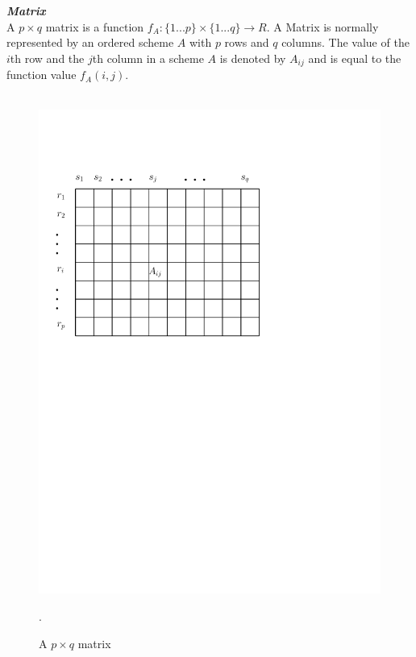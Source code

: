 \documentclass[12pt,a4paper,twoside]{scrartcl}
\numberwithin{equation}{section}
\begin{document}
\emph{\textbf{Matrix}}\\
A $p\times q$ matrix is a function $f_A: \{1...p\}\times\{1...q\}\rightarrow R$. A Matrix is normally represented by an ordered scheme $A$ with $p$ rows and $q$ columns. The value of the $i$th row and the $j$th column in a scheme $A$ is denoted by $A_{ij}$ and is equal to the function value $f_A(i, j)$.
\begin{figure}[h!]
\centering
 \hbox{\hspace{12em} \includegraphics[scale = 0.6]{1/matrix.pdf}}
 \caption{A $p\times q$ matrix}.
\end{figure}
\end{document}
